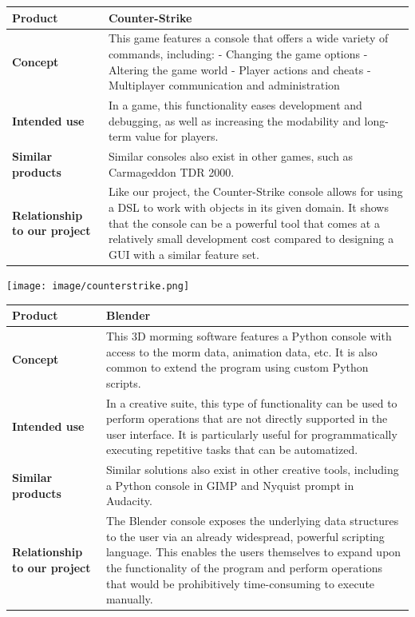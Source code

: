 \begin{center}
\begin{tabularx}{\textwidth}{ l X }
\hline
\textbf{Product} & Counter-Strike \\ \hline
\textbf{Concept} & This game features a console that offers a wide variety of commands, including:
- Changing the game options
- Altering the game world
- Player actions and cheats
- Multiplayer communication and administration \\ \hline
\textbf{Intended use} & In a game, this functionality eases development and debugging, as well as increasing the modability and long-term value for players. \\ \hline
\textbf{Similar products} & Similar consoles also exist in other games, such as Carmageddon TDR 2000. \\ \hline
\textbf{Relationship to our project} & Like our project, the Counter-Strike console allows for using a DSL to work with objects in its given domain. It shows that the console can be a powerful tool that comes at a relatively small development cost compared to designing a GUI with a similar feature set. \\ \hline
\end{tabularx}
\label{tab:csc}
\end{center}

\begin{center}
\texttt{[image: image/counterstrike.png]}
\label{cscimage}%
\end{center}

\begin{center}
\begin{tabularx}{\textwidth}{ l X }
\hline
\textbf{Product} & Blender \\ \hline
\textbf{Concept} & This 3D morming software features a Python console with access to the morm data, animation data, etc. It is also common to extend the program using custom Python scripts. \\ \hline
\textbf{Intended use} & In a creative suite, this type of functionality can be used to perform operations that are not directly supported in the user interface. It is particularly useful for programmatically executing repetitive tasks that can be automatized. \\ \hline
\textbf{Similar products} & Similar solutions also exist in other creative tools, including a Python console in GIMP and Nyquist prompt in Audacity. \\ \hline
\textbf{Relationship to our project} & The Blender console exposes the underlying data structures to the user via an already widespread, powerful scripting language. This enables the users themselves to expand upon the functionality of the program and perform operations that would be prohibitively time-consuming to execute manually. \\ \hline
\end{tabularx}
\label{tab:blenderc}
\end{center}

